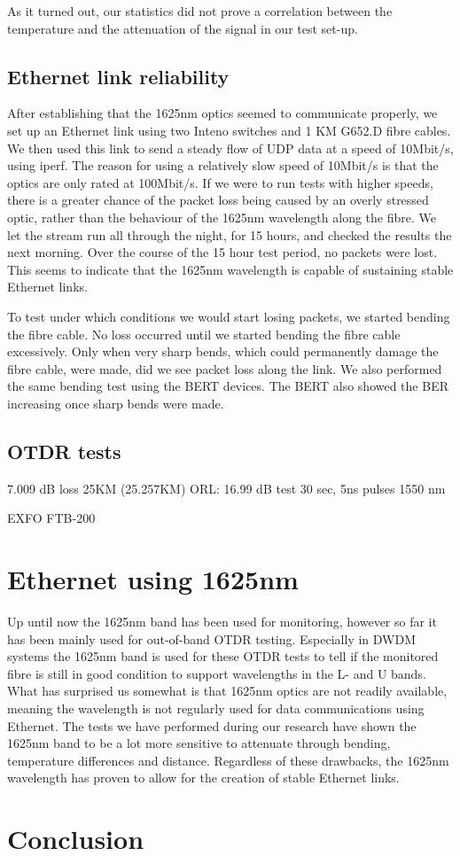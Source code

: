 \documentclass{article}
\begin{document}
As it turned out, our statistics did not prove a correlation between the temperature and the attenuation of the signal in our test set-up.

\newpage
\subsection{Ethernet link reliability}
After establishing that the 1625nm optics seemed to communicate properly, we set up an Ethernet link using two Inteno switches and 1 KM G652.D fibre cables.
We then used this link to send a steady flow of UDP data at a speed of 10Mbit/s, using iperf.
The reason for using a relatively slow speed of 10Mbit/s is that the optics are only rated at 100Mbit/s.
If we were to run tests with higher speeds, there is a greater chance of the packet loss being caused by an overly stressed optic, rather than the behaviour of the 1625nm wavelength along the fibre.
We let the stream run all through the night, for 15 hours, and checked the results the next morning.
Over the course of the 15 hour test period, no packets were lost.
This seems to indicate that the 1625nm wavelength is capable of sustaining stable Ethernet links.

To test under which conditions we would start losing packets, we started bending the fibre cable.
No loss occurred until we started bending the fibre cable excessively.
Only when very sharp bends, which could permanently damage the fibre cable, were made, did we see packet loss along the link.
We also performed the same bending test using the BERT devices.
The BERT also showed the BER increasing once sharp bends were made.

\subsection{OTDR tests}
7.009 dB loss 25KM (25.257KM)
ORL: 16.99 dB
test 30 sec, 5ns pulses
1550 nm

EXFO FTB-200

\section{Ethernet using 1625nm}
Up until now the 1625nm band has been used for monitoring, however so far it has been mainly used for out-of-band OTDR testing.
Especially in DWDM systems the 1625nm band is used for these OTDR tests to tell if the monitored fibre is still in good condition to support wavelengths in the L- and U bands.
What has surprised us somewhat is that 1625nm optics are not readily available, meaning the wavelength is not regularly used for data communications using Ethernet.
The tests we have performed during our research have shown the 1625nm band to be a lot more sensitive to attenuate through bending, temperature differences and distance.
Regardless of these drawbacks, the 1625nm wavelength has proven to allow for the creation of stable Ethernet links.




\newpage
\section{Conclusion}


\end{document}
